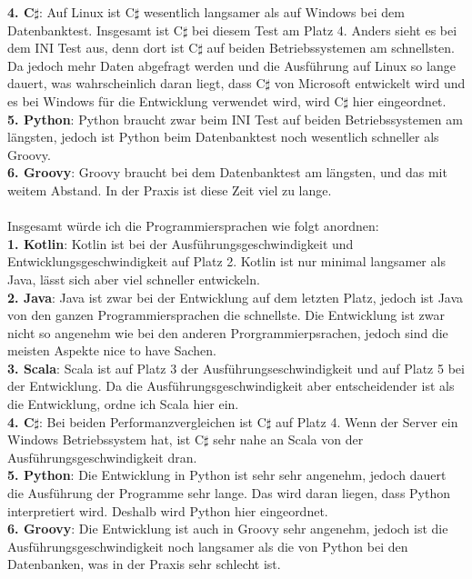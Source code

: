 \documentclass[ngerman]{article}
\begin{document}
    \textbf{4. C$\sharp$}: Auf Linux ist C$\sharp$ wesentlich langsamer als auf Windows bei dem Datenbanktest. Insgesamt ist C$\sharp$ bei diesem Test am Platz 4. Anders sieht es bei dem INI Test aus, denn dort ist C$\sharp$ auf beiden Betriebssystemen am schnellsten. Da jedoch mehr Daten abgefragt werden und die Ausführung auf Linux so lange dauert, was wahrscheinlich daran liegt, dass C$\sharp$ von Microsoft entwickelt wird und es bei Windows für die Entwicklung verwendet wird, wird C$\sharp$ hier eingeordnet.\\
    \textbf{5. Python}: Python braucht zwar beim INI Test auf beiden Betriebssystemen am längsten, jedoch ist Python beim Datenbanktest noch wesentlich schneller als Groovy.\\
    \textbf{6. Groovy}: Groovy braucht bei dem Datenbanktest am längsten, und das mit weitem Abstand. In der Praxis ist diese Zeit viel zu lange.\\\\
    Insgesamt würde ich die Programmiersprachen wie folgt anordnen:\\
    \textbf{1. Kotlin}: Kotlin ist bei der Ausführungsgeschwindigkeit und Entwicklungsgeschwindigkeit auf Platz 2. Kotlin ist nur minimal langsamer als Java, lässt sich aber viel schneller entwickeln.\\
    \textbf{2. Java}: Java ist zwar bei der Entwicklung auf dem letzten Platz, jedoch ist Java von den ganzen Programmiersprachen die schnellste. Die Entwicklung ist zwar nicht so angenehm wie bei den anderen Prorgrammierpsrachen, jedoch sind die meisten Aspekte nice to have Sachen.\\
    \textbf{3. Scala}: Scala ist auf Platz 3 der Ausführungseschwindigkeit und auf Platz 5 bei der Entwicklung. Da die Ausführungsgeschwindigkeit aber entscheidender ist als die Entwicklung, ordne ich Scala hier ein.\\
    \textbf{4. C$\sharp$}: Bei beiden Performanzvergleichen ist C$\sharp$ auf Platz 4. Wenn der Server ein Windows Betriebssystem hat, ist C$\sharp$ sehr nahe an Scala von der Ausführungsgeschwindigkeit dran.\\
    \textbf{5. Python}: Die Entwicklung in Python ist sehr sehr angenehm, jedoch dauert die Ausführung der Programme sehr lange. Das wird daran liegen, dass Python interpretiert wird. Deshalb wird Python hier eingeordnet.\\
    \textbf{6. Groovy}: Die Entwicklung ist auch in Groovy sehr angenehm, jedoch ist die Ausführungsgeschwindigkeit noch langsamer als die von Python bei den Datenbanken, was in der Praxis sehr schlecht ist.\\\\
\end{document}

